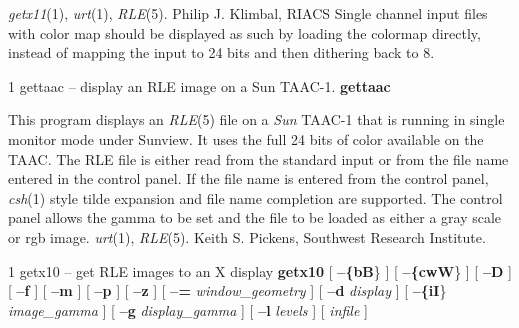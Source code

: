 {\it getx11}{\rm (1),}
{\it urt}{\rm (1),}
{\it RLE}{\rm (5).}
Philip J. Klimbal, RIACS
Single channel input files with color map should be displayed as such
by loading the colormap directly,
instead of mapping the input to 24 bits and then dithering back to 8.
\newpage


%
%
%
%
%
 1
gettaac -- display an RLE image on a Sun TAAC-1.
{\bf gettaac}

This program displays an
{\it RLE}{\rm (5)}
file on a
{\it Sun} TAAC-1
that is running in single monitor mode under Sunview.
It uses the full 24 bits of color available on the TAAC.
The RLE file is either read from the standard input or
from the file name entered in the control panel.  If the
file name is entered from the control panel,
{\it csh}{\rm (1)}
style tilde expansion and
file name completion are supported.  The control
panel allows the gamma to be set and the file to be
loaded as either a gray scale or rgb image.
{\it urt}{\rm (1),}
{\it RLE}{\rm (5).}
Keith S. Pickens, Southwest Research Institute.


\newpage


%
%
%
 1
getx10 -- get RLE images to an X display
{\bf getx10}
[
{\bf --\{bB}\}
] [
{\bf --\{cwW}\}
] [
{\bf --D}
] [
{\bf --f}
] [
{\bf --m}
] [
{\bf --p}
] [
{\bf --z}
] [
{\bf --=}
{\it window\_geometry}
] [
{\bf --d}
{\it display}
] [
{\bf --\{iI}\}
{\it image\_gamma}
] [
{\bf --g}
{\it display\_gamma}
] [
{\bf --l} 
{\it levels}
] [ 
{\it infile}
]

